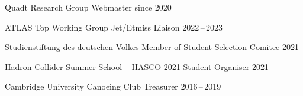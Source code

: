 \begin{cvhonors}

  \cvhonor
    {Quadt Research Group} %
    {Webmaster} %
    {} %
    {since 2020} %

  \cvhonor
    {ATLAS Top Working Group} %
    {Jet/Etmiss Liaison} %
    {} %
    {2022\,--\,2023} %


  \cvhonor
    {Studienstiftung des deutschen Volkes} %
    {Member of Student Selection Comitee} %
    {} %
    {2021} %

  \cvhonor
    {Hadron Collider Summer School -- HASCO 2021} %
    {Student Organiser} %
    {} %
    {2021} %

  \cvhonor
    {Cambridge University Canoeing Club} %
    {Treasurer} %
    {} %
    {2016\,--\,2019} %

\end{cvhonors}



\begin{cvpubs}



\end{cvpubs}


%

% 
